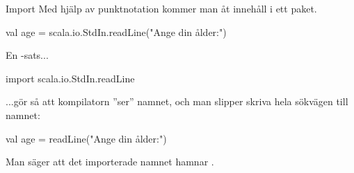 \begin{Slide}{Import}
Med hjälp av punktnotation kommer man åt innehåll i ett paket.\\
\begin{Code}
val age = scala.io.StdIn.readLine("Ange din ålder:")
\end{Code}

En -sats...

\begin{Code}
import scala.io.StdIn.readLine
\end{Code}

...gör så att kompilatorn ''ser'' namnet, och man slipper skriva hela sökvägen till namnet:
\begin{Code}
val age = readLine("Ange din ålder:")
\end{Code}

Man säger att det importerade namnet hamnar .
\end{Slide}



